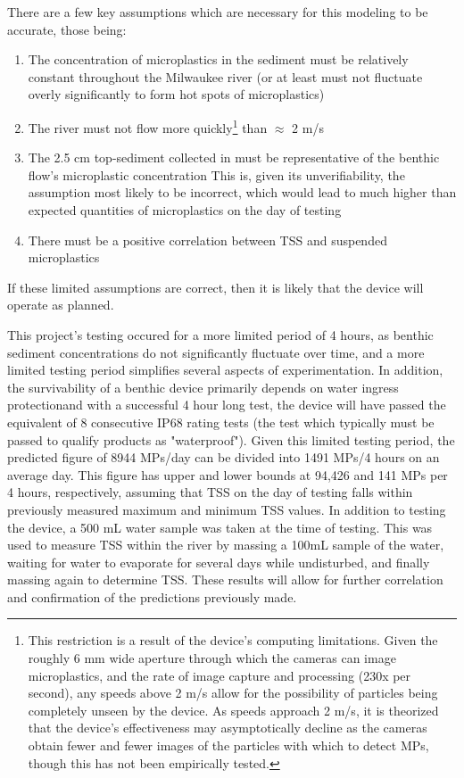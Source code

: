 \documentclass[fleqn,10pt]{SelfArx} %
\begin{document}
	
	There are a few key assumptions which are necessary for this modeling to be accurate, those being:
	\begin{enumerate}
		\item The concentration of microplastics in the sediment must be relatively constant throughout the Milwaukee river (or at least must not fluctuate overly significantly to form hot spots of microplastics)
		\item The river must not flow more quickly\footnote{This restriction is a result of the device's computing limitations. Given the roughly 6 mm wide aperture through which the cameras can image microplastics, and the rate of image capture and processing (230x per second), any speeds above 2 m/s allow for the possibility of particles being completely unseen by the device. As speeds approach 2 m/s, it is theorized that the device's effectiveness may asymptotically decline as the cameras obtain fewer and fewer images of the particles with which to detect MPs, though this has not been empirically tested.} than $\approx$ 2 m/s
		\item The 2.5 cm top-sediment collected in \cite{LenakerEtAlvertdist} must be representative of the \gls{benthic} flow's microplastic concentration
		\subitem This is, given its unverifiability, the assumption most likely to be incorrect, which would lead to much higher than expected quantities of microplastics on the day of testing
		\item There must be a positive correlation between TSS and suspended microplastics
	\end{enumerate}
	If these limited assumptions are correct, then it is likely that the device will operate as planned. %
	
	This project's testing occured for a more limited period of 4 hours, as \gls{benthic} sediment concentrations do not significantly fluctuate over time, and a more limited testing period simplifies several aspects of experimentation. In addition, the survivability of a \gls{benthic} device primarily depends on water ingress protection\textemdash and with a successful 4 hour long test, the device will have passed the equivalent of 8 consecutive IP68 rating tests (the test which typically must be passed to qualify products as "waterproof"). Given this limited testing period, the predicted figure of 8944 MPs/day can be divided into 1491 MPs/4 hours on an average day. This figure has upper and lower bounds at 94,426 and 141 MPs per 4 hours, respectively, assuming that TSS on the day of testing falls within previously measured maximum and minimum TSS values.
	\linebreak
	In addition to testing the device, a 500 mL water sample was taken at the time of testing. This was used to measure TSS within the river by massing a 100mL sample of the water, waiting for water to evaporate for several days while undisturbed, and finally massing again to determine TSS. These results will allow for further correlation and confirmation of the predictions previously made.
\end{document}
